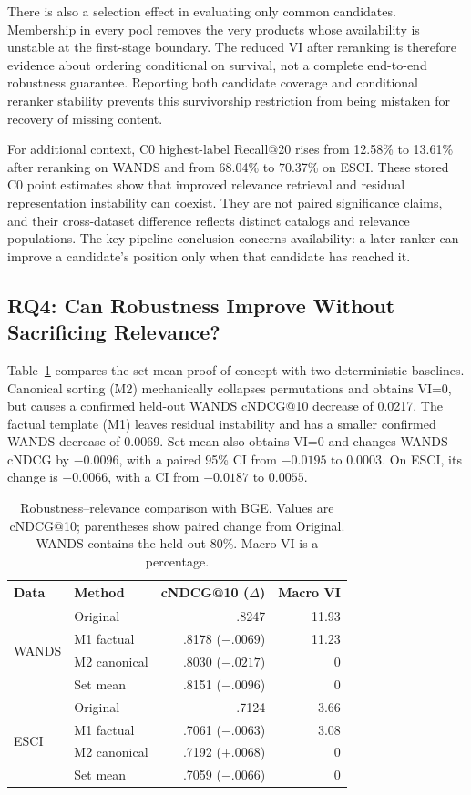 There is also a selection effect in evaluating only common candidates. Membership in every pool removes the very products whose availability is unstable at the first-stage boundary. The reduced VI after reranking is therefore evidence about ordering conditional on survival, not a complete end-to-end robustness guarantee. Reporting both candidate coverage and conditional reranker stability prevents this survivorship restriction from being mistaken for recovery of missing content.

For additional context, C0 highest-label Recall@20 rises from 12.58\% to 13.61\% after reranking on WANDS and from 68.04\% to 70.37\% on ESCI. These stored C0 point estimates show that improved relevance retrieval and residual representation instability can coexist. They are not paired significance claims, and their cross-dataset difference reflects distinct catalogs and relevance populations. The key pipeline conclusion concerns availability: a later ranker can improve a candidate's position only when that candidate has reached it.

\subsection{RQ4: Can Robustness Improve Without Sacrificing Relevance?}

Table~\ref{tab:mitigation} compares the set-mean proof of concept with two deterministic baselines. Canonical sorting (M2) mechanically collapses permutations and obtains VI=0, but causes a confirmed held-out WANDS cNDCG@10 decrease of 0.0217. The factual template (M1) leaves residual instability and has a smaller confirmed WANDS decrease of 0.0069. Set mean also obtains VI=0 and changes WANDS cNDCG by $-0.0096$, with a paired 95\% CI from $-0.0195$ to $0.0003$. On ESCI, its change is $-0.0066$, with a CI from $-0.0187$ to $0.0055$.

\begin{table}[t]
\caption{Robustness--relevance comparison with BGE. Values are cNDCG@10; parentheses show paired change from Original. WANDS contains the held-out 80\%. Macro VI is a percentage.}
\label{tab:mitigation}
\centering
\small
\begin{tabular}{llrr}
\toprule
Data & Method & cNDCG@10 ($\Delta$) & Macro VI \\
\midrule
\multirow{4}{*}{WANDS}
 & Original & .8247 & 11.93 \\
 & M1 factual & .8178 ($-.0069$) & 11.23 \\
 & M2 canonical & .8030 ($-.0217$) & 0 \\
 & Set mean & .8151 ($-.0096$) & 0 \\
\midrule
\multirow{4}{*}{ESCI}
 & Original & .7124 & 3.66 \\
 & M1 factual & .7061 ($-.0063$) & 3.08 \\
 & M2 canonical & .7192 ($+.0068$) & 0 \\
 & Set mean & .7059 ($-.0066$) & 0 \\
\bottomrule
\end{tabular}
\end{table}

